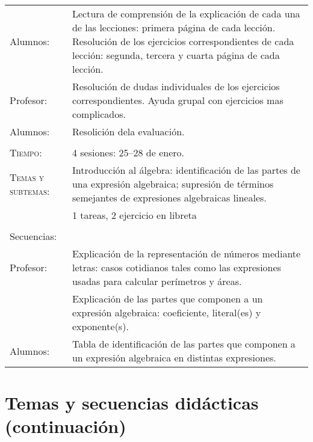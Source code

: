\documentclass[letterpaper,10pt]{article}
\begin{document}
\begin{tabular}[t]{R{0.25\textwidth}p{0.71\textwidth}}
    Alumnos:    & Lectura de comprensi\'on de la explicaci\'on de cada una de
    las lecciones: primera p\'agina de cada lecci\'on. Resoluci\'on de los
    ejercicios correspondientes de cada lecci\'on: segunda, tercera y cuarta
    p\'agina de cada lecci\'on.  \\

    Profesor:   & Resoluci\'on de dudas individuales de los ejercicios
    correspondientes. Ayuda grupal con ejercicios mas complicados. \\

    Alumnos:     & Resolici\'on dela evaluaci\'on. \\
\hline\\

    \textsc{Tiempo:}          & 4 sesiones: 25--28  de enero. \\
    \textsc{Temas y subtemas:}& Introducci\'on al \'algebra:
    identificaci\'on de las partes de una expresi\'on algebraica; supresi\'on de
    t\'erminos semejantes de expresiones algebraicas lineales.\\    
    & 1 tareas, 2 ejercicio en libreta\\ \\
    \large{\sc Secuencias:} \\
    Profesor:   & Explicaci\'on de la representaci\'on de n\'umeros mediante
    letras: casos cotidianos tales como las expresiones usadas para calcular
    per\'imetros y \'areas. \\ & Explicaci\'on de las partes que componen a un
    expresi\'on algebraica: coeficiente, literal(es) y exponente(s). \\    

    Alumnos:     & Tabla de identificaci\'on de las partes que componen a un
    expresi\'on algebraica en distintas expresiones. \\    
    
\end{tabular}

\newpage
\section{Temas  y secuencias did\'acticas (continuaci\'on)}
\end{document}
